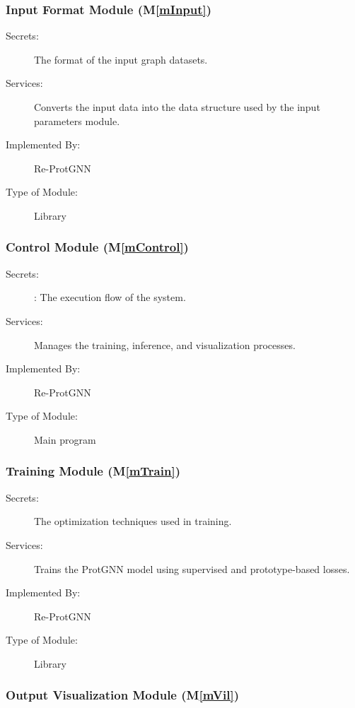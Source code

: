 \documentclass[12pt, titlepage]{article}
\newcommand{\mref}[1]{M\ref{#1}}
\begin{document}
\subsubsection{Input Format Module (\mref{mInput})}

\begin{description}
\item[Secrets:]The format of the input graph datasets.
\item[Services:]Converts the input data into the data structure used by the input parameters module.
\item[Implemented By:] Re-ProtGNN
\item[Type of Module:] Library
\end{description}

\subsubsection{Control Module (\mref{mControl})}

\begin{description}
\item[Secrets:]: The execution flow of the system.

\item[Services:]Manages the training, inference, and visualization processes.
\item[Implemented By:] Re-ProtGNN
\item[Type of Module:] Main program
\end{description}

\subsubsection{Training Module
 (\mref{mTrain})}

\begin{description}
\item[Secrets:] The optimization techniques used in training.

\item[Services:] Trains the ProtGNN model using supervised and prototype-based losses.

\item[Implemented By:] Re-ProtGNN
\item[Type of Module:] Library
\end{description}

\subsubsection{Output Visualization Module
 (\mref{mVil})}
\end{document}

